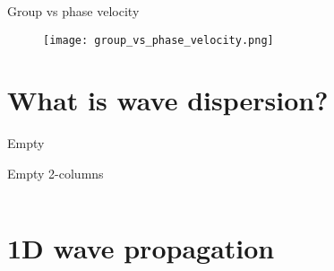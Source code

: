 \documentclass[10pt,aspectratio=169,notes]{beamer} %
\newcounter{angle}
\begin{document}
\note{
}
\begin{frame}{Group vs phase velocity}
	\begin{figure}
		\texttt{[image: group\_vs\_phase\_velocity.png]}
	\end{figure}	
\end{frame}
\section{What is wave dispersion?}
\begin{frame}{Empty}

\end{frame}
\note{
}
\begin{frame}{Empty 2-columns}
\begin{columns}[T]
	\begin{column}{0.5\textwidth}
		
	\end{column}
	\begin{column}{0.5\textwidth}
			
	\end{column}
\end{columns}		
\end{frame}
\note{
}
\section{1D wave propagation}
\end{document}

